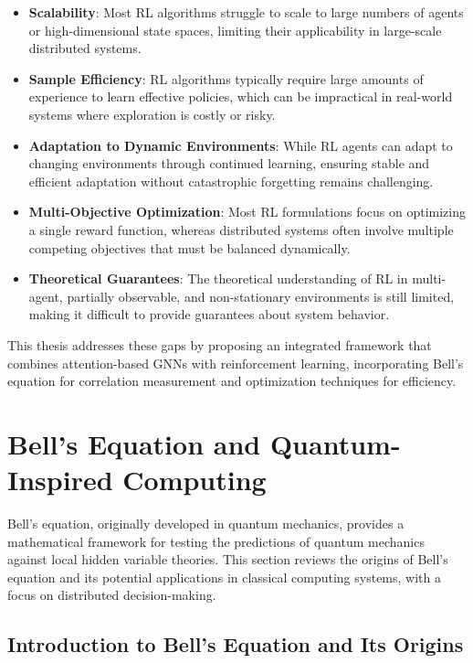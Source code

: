 \documentclass{article}
\begin{document}
\begin{itemize}
    \item \textbf{Scalability}: Most RL algorithms struggle to scale to large numbers of agents or high-dimensional state spaces, limiting their applicability in large-scale distributed systems.
    
    \item \textbf{Sample Efficiency}: RL algorithms typically require large amounts of experience to learn effective policies, which can be impractical in real-world systems where exploration is costly or risky.
    
    \item \textbf{Adaptation to Dynamic Environments}: While RL agents can adapt to changing environments through continued learning, ensuring stable and efficient adaptation without catastrophic forgetting remains challenging.
    
    \item \textbf{Multi-Objective Optimization}: Most RL formulations focus on optimizing a single reward function, whereas distributed systems often involve multiple competing objectives that must be balanced dynamically.
    
    \item \textbf{Theoretical Guarantees}: The theoretical understanding of RL in multi-agent, partially observable, and non-stationary environments is still limited, making it difficult to provide guarantees about system behavior.
\end{itemize}

This thesis addresses these gaps by proposing an integrated framework that combines attention-based GNNs with reinforcement learning, incorporating Bell's equation for correlation measurement and optimization techniques for efficiency.

\section{Bell's Equation and Quantum-Inspired Computing}

Bell's equation, originally developed in quantum mechanics, provides a mathematical framework for testing the predictions of quantum mechanics against local hidden variable theories. This section reviews the origins of Bell's equation and its potential applications in classical computing systems, with a focus on distributed decision-making.

\subsection{Introduction to Bell's Equation and Its Origins}
\end{document}
